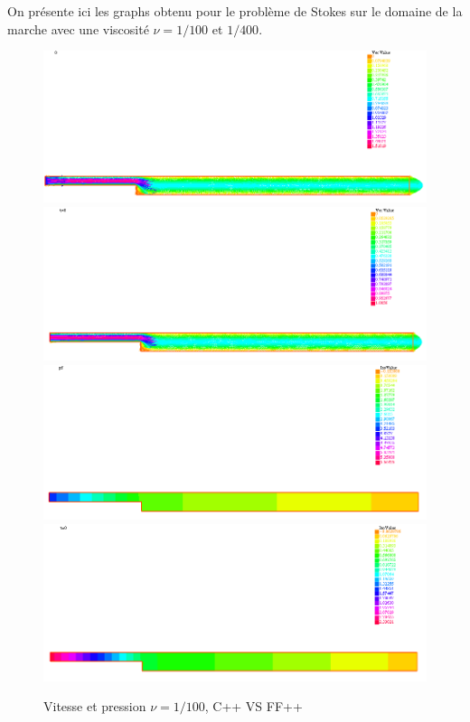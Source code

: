 \documentclass[a4paper,12pt]{article}
\begin{document}
On présente ici les graphs obtenu pour le problème de Stokes sur le domaine de la marche avec une viscosité $\nu = 1/100$ et $1/400$.

\begin{figure}[!h]
	\caption{Vitesse et pression $\nu = 1/100$, C++ VS FF++}
	\centering
	\includegraphics[width=0.49\linewidth]{image/c++_S_nu=001_t=0_u.png}
	\includegraphics[width=0.49\linewidth]{image/ff++_S_nu=001_t=0_u.png}
	\includegraphics[width=0.49\linewidth]{image/c++_S_nu=001_t=0_p.png}
	\includegraphics[width=0.49\linewidth]{image/ff++_S_nu=001_t=0_p.png}
\end{figure}
\end{document}
